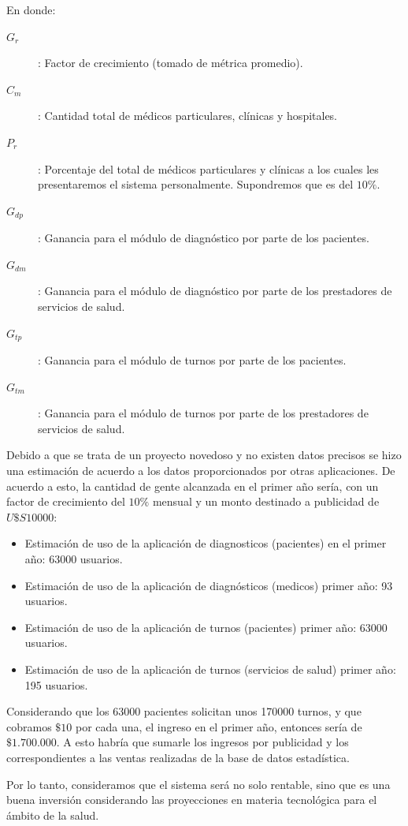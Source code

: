 \documentclass[a4paper,10pt]{article}
\begin{document}
En donde:
\begin{description}
\item[$G_r$]: Factor de crecimiento (tomado de métrica promedio).
\item[$C_m$]: Cantidad total de médicos particulares, clínicas y hospitales. 
\item[$P_r$]: Porcentaje del total de médicos particulares y clínicas a los cuales les presentaremos el sistema personalmente. Supondremos que es del $10\%$.
\item[$G_{dp}$]: Ganancia para el módulo de diagnóstico por parte de los pacientes.
\item[$G_{dm}$]: Ganancia para el módulo de diagnóstico por parte de los prestadores de servicios de salud.
\item[$G_{tp}$]: Ganancia para el módulo de turnos por parte de los pacientes.
\item[$G_{tm}$]: Ganancia para el módulo de turnos por parte de los prestadores de servicios de salud.
\end{description}
 
Debido a que se trata de un proyecto novedoso y no existen datos precisos se hizo una estimación de acuerdo a los datos proporcionados por otras aplicaciones. De acuerdo a esto, la cantidad de gente alcanzada en el primer año sería, con  un factor de crecimiento del $10\%$ mensual y un monto destinado a publicidad de $U\$S 10000$:

\begin{itemize}  
\item Estimación de uso de la aplicación de diagnosticos (pacientes) en el primer año: 63000 usuarios.
\item Estimación de uso de la aplicación de diagnósticos (medicos) primer año: 93 usuarios.
\item Estimación de uso de la aplicación de turnos (pacientes) primer año: 63000 usuarios.
\item Estimación de uso de la aplicación de turnos (servicios de salud)  primer año: 195 usuarios. 
\end{itemize}

Considerando que los 63000 pacientes solicitan unos 170000 turnos, y que cobramos $\$ 10$ por cada una, el ingreso en el primer año, entonces sería de $\$ 1.700.000$. A esto habría que sumarle los ingresos por publicidad y los correspondientes a las ventas realizadas de la base de datos estadística.

Por lo tanto, consideramos que el sistema será no solo rentable, sino que es una buena inversión considerando las proyecciones en materia tecnológica para el ámbito de la salud.
\end{document}
